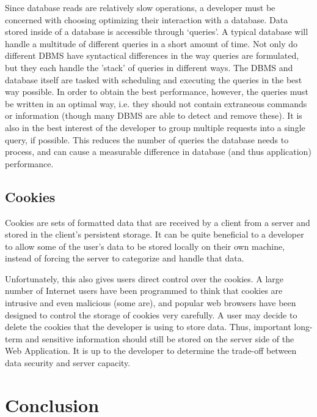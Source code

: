 \documentclass{acmsmall}
\begin{document}
Since database reads are relatively slow operations, a developer must be concerned with choosing optimizing their interaction with a database.  Data stored inside of a database is accessible through `queries'.  A typical database will handle a multitude of different queries in a short amount of time.  Not only do different DBMS have syntactical differences in the way queries are formulated, but they each handle the 'stack' of queries in different ways.  The DBMS and database itself are tasked with scheduling and executing the queries in the best way possible\cite{queries}.  In order to obtain the best performance, however, the queries must be written in an optimal way, i.e. they should not contain extraneous commands or information (though many DBMS are able to detect and remove these).  It is also in the best interest of the developer to group multiple requests into a single query, if possible.  This reduces the number of queries the database needs to process, and can cause a measurable difference in database (and thus application) performance.

\subsection{Cookies}

Cookies are sets of formatted data that are received by a client from a server and stored in the client's persistent storage.  It can be quite beneficial to a developer to allow some of the user's data to be stored locally on their own machine, instead of forcing the server to categorize and handle that data.

Unfortunately, this also gives users direct control over the cookies.  A large number of Internet users have been programmed to think that cookies are intrusive and even malicious (some are), and popular web browsers have been designed to control the storage of cookies very carefully\cite{cookies}.  A user may decide to delete the cookies that the developer is using to store data.  Thus, important long-term and sensitive information should still be stored on the server side of the Web Application.  It is up to the developer to determine the trade-off between data security and server capacity.

\section{Conclusion}
\end{document}
